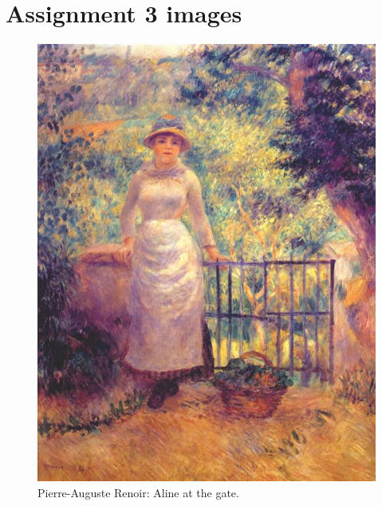 


\section{Assignment 3 images}
\label{app:artist_identification}
\begin{figure}[H]
    \centering
    \includegraphics[scale=0.3]{Graphics/Assignment3/renoir.png}
    \caption{Pierre-Auguste Renoir: Aline at the gate.}
    \label{fig:renoir}
\end{figure}

